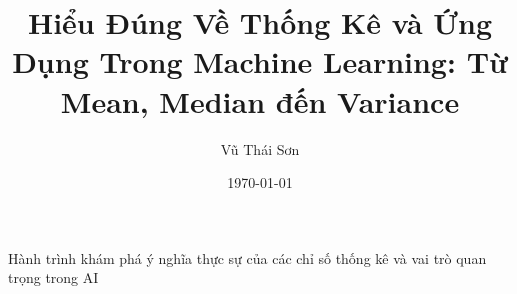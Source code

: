 \documentclass[12pt]{article}
\begin{document}
\title{Hiểu Đúng Về Thống Kê và Ứng Dụng Trong Machine Learning: Từ Mean, Median đến Variance}

\author{Vũ Thái Sơn}

\date{\today}

\maketitle

\begin{center}
\large Hành trình khám phá ý nghĩa thực sự của các chỉ số thống kê và vai trò quan trọng trong AI
\end{center}





\end{document}
